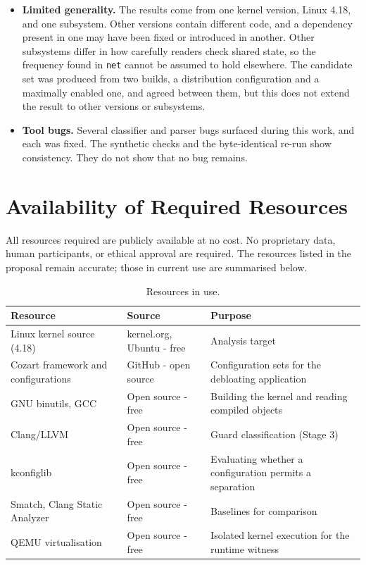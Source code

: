 \documentclass[12pt, a4paper, oneside]{book}
\begin{document}
\begin{itemize}[leftmargin=*, itemsep=6pt]
  \item \textbf{Limited generality.} The results come from one kernel version,
        Linux 4.18, and one subsystem. Other versions contain different code, and
        a dependency present in one may have been fixed or introduced in another.
        Other subsystems differ in how carefully readers check shared state, so
        the frequency found in \texttt{net} cannot be assumed to hold elsewhere.
        The candidate set was produced from two builds, a distribution
        configuration and a maximally enabled one, and agreed between them, but
        this does not extend the result to other versions or subsystems.

  \item \textbf{Tool bugs.} Several classifier and parser bugs surfaced during
        this work, and each was fixed. The synthetic checks and the byte-identical
        re-run show consistency. They do not show that no bug remains.
\end{itemize}

\chapter{Availability of Required Resources}

All resources required are publicly available at no cost. No proprietary data,
human participants, or ethical approval are required. The resources listed in the
proposal remain accurate; those in current use are summarised below.

\begin{table}[H]
\centering
\caption{Resources in use.}
\renewcommand{\arraystretch}{1.4}
\begin{tabularx}{\textwidth}{L{3.5cm} L{3.5cm} L{5.5cm}}
\toprule
\textbf{Resource} & \textbf{Source} & \textbf{Purpose} \\
\midrule
Linux kernel source (4.18) & kernel.org, Ubuntu - free &
  Analysis target \\
\addlinespace
Cozart framework and configurations & GitHub - open source \citep{kuo2020cozart} &
  Configuration sets for the debloating application \\
\addlinespace
GNU binutils, GCC & Open source - free &
  Building the kernel and reading compiled objects \\
\addlinespace
Clang/LLVM & Open source - free &
  Guard classification (Stage 3) \\
\addlinespace
kconfiglib & Open source - free &
  Evaluating whether a configuration permits a separation \\
\addlinespace
Smatch, Clang Static Analyzer & Open source - free &
  Baselines for comparison \\
\addlinespace
QEMU virtualisation & Open source - free &
  Isolated kernel execution for the runtime witness \\
\bottomrule
\end{tabularx}
\end{table}
\end{document}
